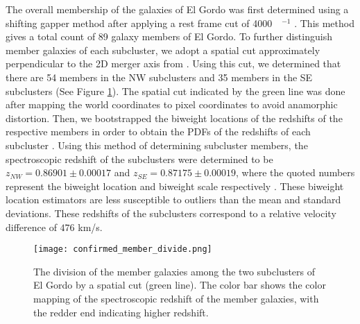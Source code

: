 
The overall membership of the galaxies
of El Gordo was first determined using a shifting gapper method
\citep{Fadda96} after applying a rest frame cut of
4000~\kilo\meter~\second$^{-1}$ \citep{Sifon13}. This method gives a
total count of 89 galaxy members of El Gordo.
To further distinguish member galaxies of each subcluster, we adopt a spatial cut approximately perpendicular to the 2D merger axis
from . Using this cut, we determined that there are 54
members in the NW subclusters and 35 members in the SE subclusters (See Figure
\ref{fig:membership}). The spatial cut indicated by the green line was done after
mapping the world coordinates to pixel coordinates to avoid anamorphic distortion. 
Then, we bootstrapped the biweight locations of the redshifts of the
respective members in order to obtain the PDFs of the redshifts of each
subcluster 
\citep{Sifon13}. Using this method of determining subcluster members, the spectroscopic
redshift of the subclusters were determined to be $z_{NW} = 0.86901 \pm
0.00017$ and $z_{SE} = 0.87175 \pm 0.00019$, where the quoted numbers represent the biweight location and
biweight scale respectively \citep{Beers90}. 
These biweight location
estimators are less susceptible to outliers than the mean and standard
deviations. These redshifts of the subclusters correspond to a relative
velocity difference of $476$ km/s. 

\begin{figure}
	\texttt{[image: confirmed\_member\_divide.png]}
	\caption{\label{fig:membership} The division of
the member galaxies among the two subclusters of El Gordo by a spatial cut
(green line). The color bar shows the color mapping of the spectroscopic
redshift of the member galaxies, with the redder end indicating higher
redshift.} 
\end{figure}

%
